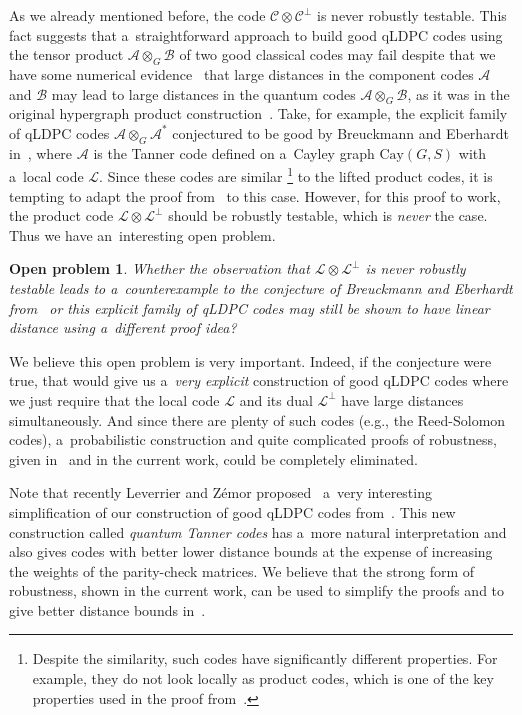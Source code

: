 \documentclass[11pt]{article}
\theoremstyle{plain}
\newtheorem*{problem}{Open problem}
\theoremstyle{definition}
\theoremstyle{remark}
\newcommand{\cA}{\mathcal{A}}
\newcommand{\cB}{\mathcal{B}}
\newcommand{\cC}{\mathcal{C}}
\newcommand{\cL}{\mathcal{L}}
\newcommand{\cay}{\mathrm{Cay}}
\begin{document}
As we already mentioned before, the code $\cC \otimes \cC^\perp$ is never robustly testable. This fact suggests that a~straightforward approach to build good qLDPC codes using the tensor product $\cA \otimes_G \cB$ of two good classical codes may fail despite that we have some numerical evidence~\cite[Example~4]{Panteleev&Kalachev:2021} that large distances in the component codes $\cA$ and $\cB$ may lead to large distances in the quantum codes $\cA \otimes_G \cB$, as it was in the original hypergraph product construction~\cite{Tillich&Zemor:2009}. Take, for example, the explicit family of qLDPC codes $\cA \otimes_G \cA^*$ conjectured to be good by Breuckmann and Eberhardt in~\cite{Breuckmann:balanced:2021}, where $\cA$ is the Tanner code defined on a~Cayley graph $\cay(G,S)$ with a~local code $\cL$. Since these codes are similar%
\footnote{Despite the similarity, such codes have significantly different properties. For example, they do not look locally as product codes, which is one of the key properties used in the proof from~\cite{Panteleev&Kalachev:stoc2022}.} 
to the lifted product codes, it is tempting to adapt the proof from~\cite{Panteleev&Kalachev:stoc2022} to this case. However, for this proof to work, the product code $\cL \otimes \cL^\perp$ should be robustly testable, which is \emph{never} the case. Thus we have an~interesting open problem. 

\begin{problem}
    Whether the observation that $\cL\otimes \cL^\perp$ is never robustly testable leads to a~counterexample to the conjecture of Breuckmann and Eberhardt from~\cite{Breuckmann:balanced:2021} or this explicit family of qLDPC codes may still be shown to have linear distance using a~different proof idea?       
\end{problem}

We believe this open problem is very important. Indeed, if the conjecture were true, that would give us a~\emph{very explicit} construction of good qLDPC codes where we just require that the local code $\cL$ and its dual $\cL^\perp$ have large distances simultaneously. And since there are plenty of such codes (e.g., the Reed-Solomon codes), a~probabilistic construction and quite complicated proofs of robustness, given in~\cite{Panteleev&Kalachev:stoc2022} and in the current work, could be completely eliminated.  


Note that recently Leverrier and Z{\'e}mor proposed~\cite{Leverrier:focs2022} a~very interesting simplification of our construction of good qLDPC codes from~\cite{Panteleev&Kalachev:stoc2022}. This new construction called \emph{quantum Tanner codes} has a~more natural interpretation and also gives codes with better lower distance bounds at the expense of increasing the weights of the parity-check matrices. We believe that the strong form of robustness, shown in the current work, can be used to simplify the proofs and to give better distance bounds in~\cite{Panteleev&Kalachev:stoc2022, Leverrier:focs2022}.
\end{document}
